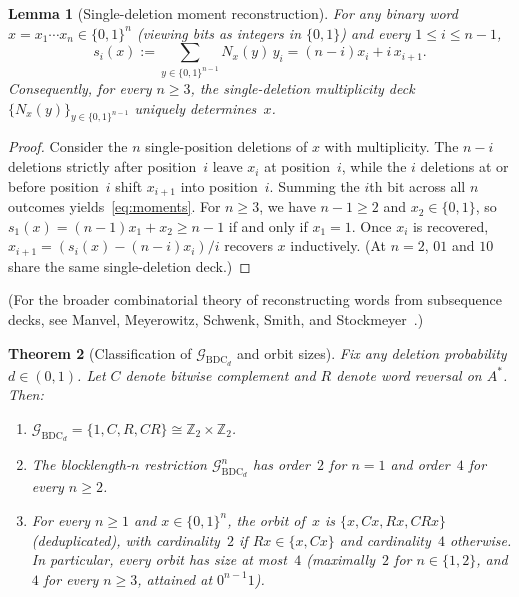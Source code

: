 \documentclass[11pt]{article}
\theoremstyle{plain}
\newtheorem{theorem}{Theorem}
\newtheorem{lemma}[theorem]{Lemma}
\theoremstyle{definition}
\theoremstyle{remark}
\DeclareMathOperator{\BDC}{BDC}
\begin{document}
\begin{lemma}[Single-deletion moment reconstruction]\label{lem:reconstruct}
For any binary word $x = x_1 \cdots x_n \in \{0, 1\}^n$ (viewing bits as integers in $\{0, 1\}$) and every $1 \le i \le n - 1$,
\begin{equation}\label{eq:moments}
s_i(x) := \sum_{y \in \{0, 1\}^{n-1}} N_x(y)\, y_i = (n - i) x_i + i\, x_{i+1}.
\end{equation}
Consequently, for every $n \ge 3$, the single-deletion multiplicity deck $\{N_x(y)\}_{y \in \{0, 1\}^{n-1}}$ uniquely determines~$x$.
\end{lemma}

\begin{proof}
Consider the $n$ single-position deletions of $x$ with multiplicity. The $n - i$ deletions strictly after position~$i$ leave $x_i$ at position~$i$, while the $i$ deletions at or before position~$i$ shift $x_{i+1}$ into position~$i$. Summing the $i$th bit across all $n$ outcomes yields~\eqref{eq:moments}.
For $n \ge 3$, we have $n - 1 \ge 2$ and $x_2 \in \{0, 1\}$, so $s_1(x) = (n - 1)x_1 + x_2 \ge n - 1$ if and only if $x_1 = 1$. Once $x_i$ is recovered, $x_{i+1} = (s_i(x) - (n - i)x_i)/i$ recovers $x$ inductively. (At $n = 2$, $01$ and $10$ share the same single-deletion deck.)
\end{proof}

(For the broader combinatorial theory of reconstructing words from subsequence decks, see Manvel, Meyerowitz, Schwenk, Smith, and Stockmeyer~\cite{manvel1991}.)

\begin{theorem}[Classification of $\mathcal{G}_{\BDC_d}$ and orbit sizes]\label{thm:main}
Fix any deletion probability $d \in (0, 1)$. Let $C$ denote bitwise complement and $R$ denote word reversal on $A^*$. Then:
\begin{enumerate}[label=\textup{(\arabic*)},nosep]
\item $\mathcal{G}_{\BDC_d} = \{1, C, R, CR\} \cong \mathbb{Z}_2 \times \mathbb{Z}_2$.
\item The blocklength-$n$ restriction $\mathcal{G}_{\BDC_d}^n$ has order~$2$ for $n = 1$ and order~$4$ for every $n \ge 2$.
\item For every $n \ge 1$ and $x \in \{0, 1\}^n$, the orbit of~$x$ is $\{x, Cx, Rx, CRx\}$ (deduplicated), with cardinality~$2$ if $Rx \in \{x, Cx\}$ and cardinality~$4$ otherwise. In particular, every orbit has size at most~$4$ (maximally~$2$ for $n \in \{1, 2\}$, and $4$ for every $n \ge 3$, attained at $0^{n-1}1$).
\end{enumerate}
\end{theorem}
\end{document}
